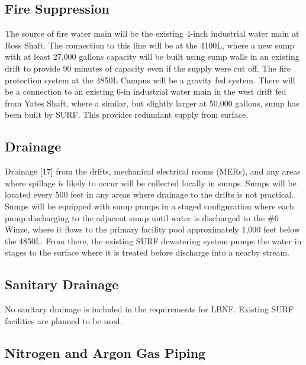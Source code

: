 \subsection{Fire Suppression}
\label{sec:fscf-und-fire-supp}

The source of fire water main will be the existing 4-inch industrial water main at Ross Shaft. The connection to this line will be at the 4100L, where a new sump with at least 27,000 gallons capacity will be built using sump walls in an existing drift to provide 90 minutes of capacity even if the supply were cut off. The fire protection system at the 4850L Campus will be a gravity fed system. There will be a connection to an existing 6-in industrial water main in the west drift fed from Yates Shaft, where a similar, but slightly larger at 50,000 gallons, sump has been built by SURF. This provides redundant supply from surface.

\subsection{Drainage}
\label{sec:fscf-und-drain}

Drainage [17] from the drifts, mechanical electrical rooms (MERs), and any areas where spillage is likely to occur will be collected locally in sumps. Sumps will be located every 500 feet in any areas where drainage to the drifts is not practical. Sumps will be equipped with sump pumps in a staged configuration where each pump discharging to the adjacent sump until water is discharged to the \#6 Winze, where it flows to the primary facility pool approximately 1,000 feet below the 4850L. From there, the existing SURF dewatering system pumps the water in stages to the surface where it is treated before discharge into a nearby stream.

\subsection{Sanitary Drainage}
\label{sec:fscf-und-san-drain}

No sanitary drainage is included in the requirements for LBNF. Existing SURF facilities are planned to be used.

\subsection{Nitrogen and Argon Gas Piping}
\label{sec:fscf-und-gas-piping}

